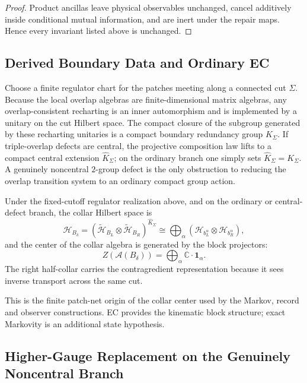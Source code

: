 \begin{proof}
Product ancillas leave physical observables unchanged, cancel additively inside conditional mutual
information, and are inert under the repair maps. Hence every invariant listed above is unchanged.
\end{proof}

\subsection{Derived Boundary Data and Ordinary EC}

\begin{proposition}
Choose a finite regulator chart for the patches meeting along a connected cut \(\Sigma\). Because
the local overlap algebras are finite-dimensional matrix algebras, any overlap-consistent
recharting is an inner automorphism and is implemented by a unitary on the cut Hilbert space. The
compact closure of the subgroup generated by these recharting unitaries is a compact boundary
redundancy group \(K_\Sigma\). If triple-overlap defects are central, the projective composition
law lifts to a compact central extension \(\widehat K_\Sigma\); on the ordinary branch one simply
sets \(\widehat K_\Sigma = K_\Sigma\). A genuinely noncentral \(2\)-group defect is the only
obstruction to reducing the overlap transition system to an ordinary compact group action.
\end{proposition}

\begin{theorem}
Under the fixed-cutoff regulator realization above, and on the ordinary or central-defect branch,
the collar Hilbert space is
\[
\mathcal H_{B_\delta}
=
(\tilde{\mathcal H}_{B_L}\otimes \tilde{\mathcal H}_{B_R})^{\widehat K_\Sigma}
\cong
\bigoplus_{\alpha}
\left(\mathcal H_{b_L^\alpha}\otimes \mathcal H_{b_R^\alpha}\right),
\]
and the center of the collar algebra is generated by the block projectors:
\[
Z(\mathcal A(B_\delta))
=
\bigoplus_\alpha \mathbb C\cdot \mathbf 1_\alpha.
\]
The right half-collar carries the contragredient representation because it sees inverse transport
across the same cut.
\end{theorem}

This is the finite patch-net origin of the collar center used by the Markov,
record and observer constructions. EC provides the kinematic block
structure; exact Markovity is an additional state hypothesis.

\subsection{Higher-Gauge Replacement on the Genuinely Noncentral Branch}

